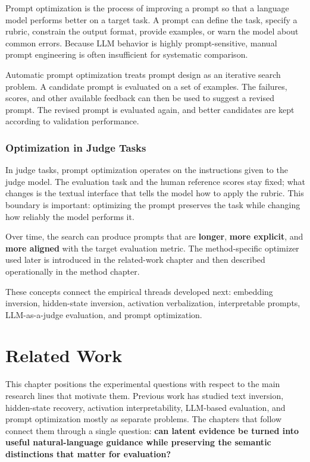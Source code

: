 \documentclass[12pt,a4paper,twoside,openright]{book}
\begin{document}
Prompt optimization is the process of improving a prompt so that a language
model performs better on a target task. A prompt can define the task, specify a
rubric, constrain the output format, provide examples, or warn the model about
common errors. Because LLM behavior is highly prompt-sensitive, manual prompt
engineering is often insufficient for systematic comparison.

Automatic prompt optimization treats prompt design as an iterative search
problem. A candidate prompt is evaluated on a set of examples. The failures,
scores, and other available feedback can then be used to suggest a revised
prompt. The revised prompt is evaluated again, and better candidates are kept
according to validation performance.

\subsection{Optimization in Judge Tasks}

In judge tasks, prompt optimization operates on the instructions given to the
judge model. The evaluation task and the human reference scores stay fixed; what
changes is the textual interface that tells the model how to apply the rubric.
This boundary is important: optimizing the prompt preserves the task while
changing how reliably the model performs it.

Over time, the search can produce prompts that are \textbf{longer},
\textbf{more explicit}, and \textbf{more aligned} with the target evaluation
metric. The method-specific optimizer used later is introduced in
the related-work chapter and then described operationally in the method chapter.

These concepts connect the empirical threads developed next: embedding
inversion, hidden-state inversion, activation verbalization, interpretable
prompts, LLM-as-a-judge evaluation, and prompt optimization.

\chapter{Related Work}
\label{chapter:related-work}

This chapter positions the experimental questions with respect to the main
research lines that motivate them. Previous work has studied text inversion,
hidden-state recovery, activation interpretability, LLM-based evaluation, and
prompt optimization mostly as separate problems. The chapters that follow
connect them through a single question:
\textbf{can latent evidence be turned into useful natural-language guidance
while preserving the semantic distinctions that matter for evaluation?}
\end{document}
